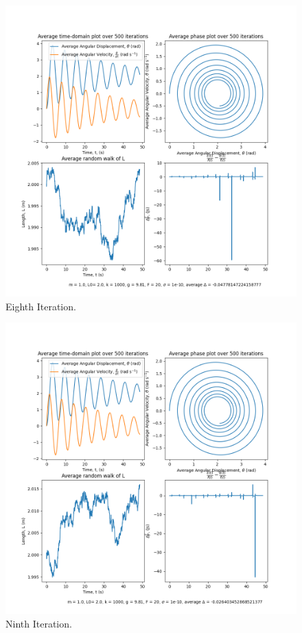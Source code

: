 \documentclass[10pt, twocolumn]{article}
\begin{document}
\begin{figure}
    \centering
    \includegraphics[width = \columnwidth]{Projects/ForcedSimplePendulum/Plots/m = 1.0, L0= 2.0, k = 1000, g = 9.81, F = 20, sigma = 1e-10, run number 7.png}
    \caption{Eighth Iteration.}
    \label{fig:enter-label}
\end{figure}

\begin{figure}
    \centering
    \includegraphics[width = \columnwidth]{Projects/ForcedSimplePendulum/Plots/m = 1.0, L0= 2.0, k = 1000, g = 9.81, F = 20, sigma = 1e-10, run number 8.png}
    \caption{Ninth Iteration.}
    \label{fig:enter-label}
\end{figure}
\end{document}

